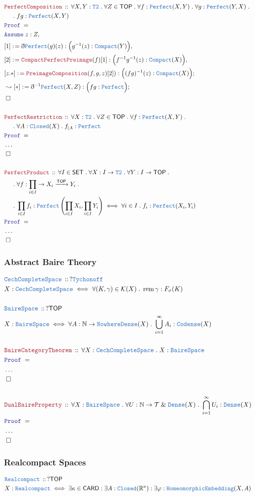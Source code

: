 \documentclass[12pt]{scrartcl}
\newcommand{\TYPE}[1]{\textcolor{NavyBlue}{\mathtt{#1}}}
\newcommand{\LOGIC}[1]{\textcolor{Blue}{\mathtt{#1}}}
\newcommand{\THM}[1]{\textcolor{Maroon}{\mathtt{#1}}}
\renewcommand{\.}{\; . \;}
\newcommand{\de}{: \kern 0.1pc =}
\newcommand{\Theorem}[2]{& \THM{#1} \, :: \, #2 \\ & \Proof = \\ }
\newcommand{\DeclareType}[2]{& \TYPE{#1} \, :: \, #2 \\}
\newcommand{\DefineType}[3]{& #1 : \TYPE{#2} \iff #3 \\}
\newcommand{\NewLine}{\\ & \kern 1pc}
\newcommand{\Page}[1]{ \begin{align*} #1 \end{align*}   }
\newcommand{ \bd }{ \ByDef }
\newcommand{\NoProof}{ & \ldots \\ \EndProof}
\renewcommand{\And}{\; \& \;}
\newcommand{\Reals}{\mathbb{R} }
\newcommand{\Nat}{\mathbb{N} }
\newcommand{\Arrow}{\xrightarrow}
\newcommand{\Say}[3]{& #1 \de #2 : #3, \\}
\newcommand{\Conclude}[3]{& #1 \de #2 : #3; \\}
\newcommand{\DeriveConclude}[3]{& \leadsto #1 \de #2 : #3 ; \\}
\newcommand{\Assume}[2]{& \LOGIC{Assume} \; #1 : #2, \\}
\newcommand{\QED}{\; \square}
\newcommand{\EndProof}{& \QED \\}
\newcommand{\ByDef}{\eth}
\newcommand{\Proof}{\LOGIC{Proof} \; }
\newcommand{\SET}{\mathsf{SET}}
\DeclareMathOperator{\rem}{rem}
\newcommand{\TOP}{\mathsf{TOP}}
\newcommand{\T}{\mathcal{T}}
\begin{document}
\Page{
	\Theorem{PerfectComposition}
	{
		\forall X,Y : \TYPE{T2} \.
		\forall Z \in \TOP \.
		\forall f : \TYPE{Perfect}(X,Y) \.
		\forall g : \TYPE{Perfect}(Y,X) \. \NewLine \.
		fg : \TYPE{Perfect}(X,Y) 
	}
	\Assume{z}{Z}
	\Say{[1]}{\bd \TYPE{Perfect}(g)(z)}{\Big( g^{-1}(z) : \TYPE{Compact}(Y) \Big)}
	\Say{[2]}{\THM{CompactPerfectPreimage}(f)[1]}{\Big( f^{-1}g^{-1}(z) : \TYPE{Compact}(X) \Big)}
	\Conclude{[z.*]}{\THM{PreimageComposition}(f,g,z)[2])}{\Big( (fg)^{-1}(z) : \TYPE{Compact}(X) \Big)}
	\DeriveConclude{[*]}{\bd^{-1}\TYPE{Perfect}(X,Z)}{\Big( fg : \TYPE{Perfect} \Big)}
	\EndProof
	\\
	\Theorem{PerfectRestriction}
	{
		\forall X : \TYPE{T2} \.
		\forall Z \in \TOP \.
		\forall f : \TYPE{Perfect}(X,Y) \. \NewLine \.
		\forall A : \TYPE{Closed}(X)   \.
		f_{|A} : \TYPE{Perfect}                           
	}
	\NoProof
	\\
	\Theorem{PerfectProduct}
	{
		\forall I \in \SET \.
		\forall X : I \to\TYPE{T2} \.
		\forall Y : I \to \TOP \. \NewLine \.
		\forall f : \prod_{i \in I} \to X_i \Arrow{\TOP} Y_i \. \NewLine \. 
		\prod_{i \in I} f_i : \TYPE{Perfect}\left(\prod_{i \in I} X_i, \prod_{i \in I} Y_i\right) 
		\iff
		\forall i \in I \. f_i : \TYPE{Perfect}(X_i,Y_i)
	}
	\NoProof
}
\newpage

\newpage
\subsubsection{Abstract Baire Theory}
\Page{
	\DeclareType{CechCompleteSpace}{?\TYPE{Tychonoff}}
	\DefineType{X}{CechCompleteSpace}{\forall (K,\gamma) \in \mathcal{K}(X) \. \rem \gamma : F_\sigma(K)}
	\\
	\DeclareType{BaireSpace}{?\TOP}
	\DefineType{X}{BaireSpace}{\forall A : \Nat \to \TYPE{NowhereDense}(X) \. \bigcup^\infty_{i=1} A_i : \TYPE{Codense}(X)}
	\\
	\Theorem{BaireCategoryTheorem}{\forall X : \TYPE{CechCompleteSpace} \. X : \TYPE{BaireSpace}  }
	\NoProof
	\\
	\Theorem{DualBaireProperty}{\forall X : \TYPE{BaireSpace} \. \forall U : \Nat \to \T \And \TYPE{Dense}(X) \. \bigcap^\infty_{i=1} U_i : \TYPE{Dense}(X)}
	\NoProof
}
\newpage
\subsubsection{Realcompact Spaces}
\Page{
	\DeclareType{Realcompact}{?\TOP}
	\DefineType{X}{Realcompact}{\exists \kappa \in \mathsf{CARD} : \exists A : \TYPE{Closed}(\Reals^\kappa) : \exists \varphi : \TYPE{HomeomorphicEmbedding}(X,A)}
}
\newpage
\end{document}
